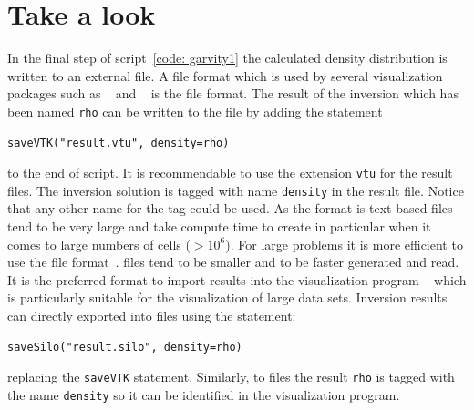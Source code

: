 \section{Take a look}
In the final step of script~\ref{code: garvity1} the calculated density distribution is written to an external file. 
A file format which is used by several visualization packages such as \VisIt~\cite{VISIT} and \mayavi~\cite{MAYAVI}
is the \VTK file format. The result of the inversion which has been named \verb|rho| can be written to the file 
 by adding the statement
\begin{verbatim}
saveVTK("result.vtu", density=rho)
\end{verbatim}
to the end of script. It is recommendable to use the extension \verb|vtu| for the \VTK result files. 
The inversion solution is tagged with name \verb|density| in the result file. Notice that any other
name for the tag could be used. As the format is text based
\VTK files tend to be very large and take compute time to create in particular when it comes to large numbers of cells ($>10^6$).
For large problems it is more efficient to use the \SILO file format~\cite{SILO}. \SILO files tend to be smaller 
and to be faster generated and read. It is the preferred format to import results into the visualization program \VisIt~\cite{VISIT}
which is particularly suitable for the visualization of large data sets. Inversion results can directly exported into \SILO files using
the statement:       
\begin{verbatim}
saveSilo("result.silo", density=rho)
\end{verbatim}
replacing the \verb|saveVTK| statement. Similarly, to \VTK files the result \verb|rho| is tagged 
with the name \verb|density| so it can be identified in the visualization program. 

